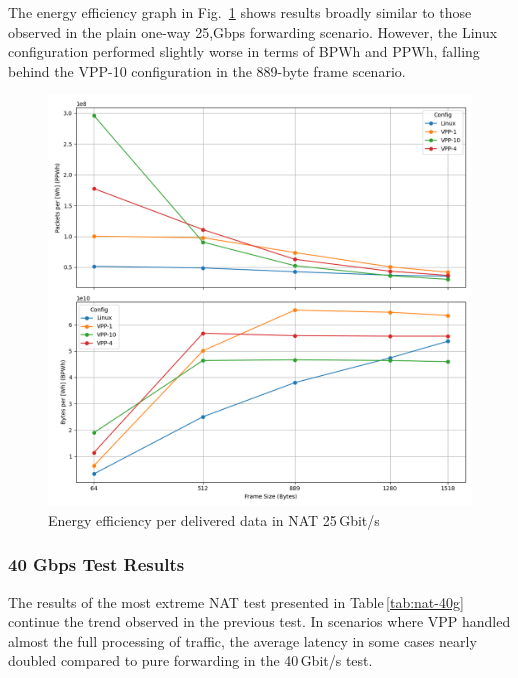 The energy efficiency graph in Fig.~\ref{fig:nat-25g} shows results broadly similar to those observed in the plain one-way 25,Gbps forwarding scenario. 
However, the Linux configuration performed slightly worse in terms of BPWh and PPWh, falling behind the VPP-10 configuration in the 889-byte frame scenario.

\begin{figure}[!htbp]
    \centering
    \includegraphics[width=\linewidth]{images/consumption-nat-25g.png}
    \caption{Energy efficiency per delivered data in NAT 25\,Gbit/s}
    \label{fig:nat-25g}
\end{figure}





\subsubsection{40 Gbps Test Results}

The results of the most extreme NAT test presented in Table \ref{tab:nat-40g} continue the trend observed in the previous test.
In scenarios where VPP handled almost the full processing of traffic, the average latency in some cases nearly doubled compared to pure forwarding in the 40 Gbit/s test.

